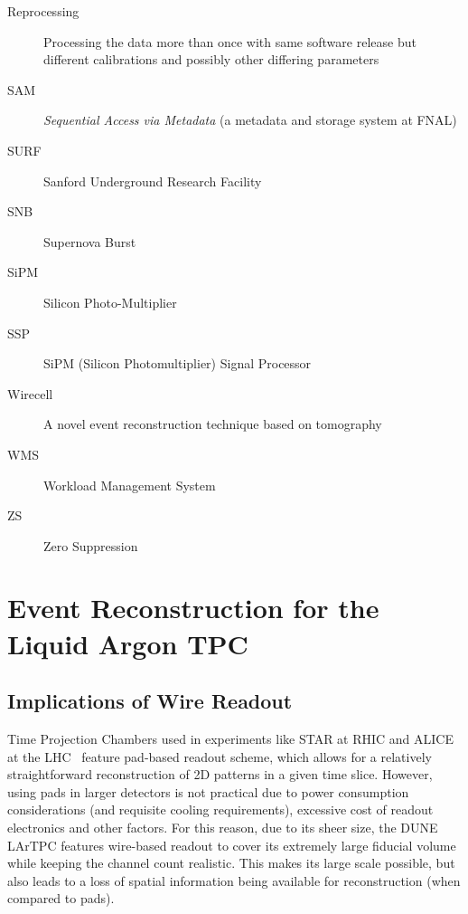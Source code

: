 \begin{description}
\item[Reprocessing] Processing the data more than once with same software release but different calibrations and possibly other differing parameters
\item[SAM] \textit{Sequential Access via Metadata} (a metadata and storage system at FNAL)
\item[SURF] Sanford Underground Research Facility
\item[SNB] Supernova Burst
\item[SiPM] Silicon Photo-Multiplier
\item[SSP] SiPM (Silicon Photomultiplier) Signal Processor
\item[Wirecell] A novel event reconstruction technique based on tomography
\item[WMS] Workload Management System
\item[ZS] Zero Suppression
\end{description}

\newpage
\section{Event Reconstruction for the Liquid Argon TPC}
\label{sec:reconstruction}
\subsection{Implications of Wire Readout}
Time Projection Chambers used in experiments like STAR at RHIC and ALICE at the LHC~\cite{alice}  feature
pad-based readout scheme, which allows for a relatively straightforward reconstruction of 2D patterns in
a given time slice. However, using pads in larger detectors is not practical due to power consumption considerations
(and requisite cooling requirements), excessive cost of readout electronics and other factors. For this reason, due
to its sheer size, the DUNE LArTPC features wire-based readout to cover its extremely large fiducial volume while
keeping the channel count realistic. This makes its large scale possible, but also leads to a loss of spatial information
being available for reconstruction (when compared to pads).

